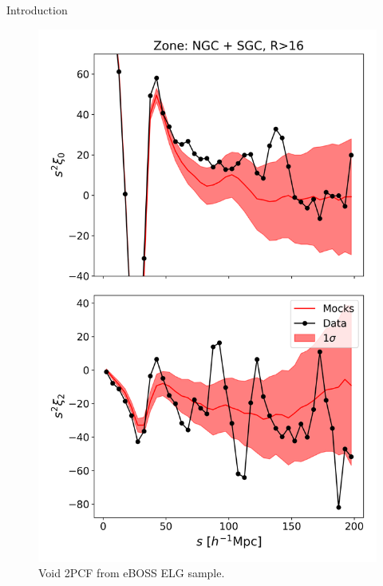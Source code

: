 \documentclass{beamer}
\begin{document}
\begin{frame}[allowframebreaks]{Introduction}
\begin{multicols}{2}
\begin{figure}
	\includegraphics[width=0.7\linewidth]{plots/void_CBZ}
	\caption{Void 2PCF from eBOSS ELG sample.}
	\label{fig:voidcbz}
\end{figure}	
\end{multicols}


\end{frame}
\end{document}
